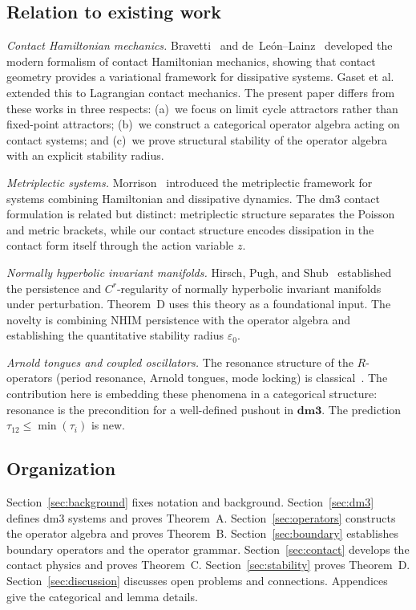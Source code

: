 \documentclass[12pt, oneside]{book}
\theoremstyle{plain}
\theoremstyle{definition}
\theoremstyle{remark}
\newcommand{\dmcat}{\mathbf{dm3}}
\begin{document}
\subsection{Relation to existing work}\label{sec:related}

\emph{Contact Hamiltonian mechanics.}
Bravetti~\cite{Bravetti2017} and de~Le\'on--Lainz~\cite{deLeonLainz2019}
developed the modern formalism of contact Hamiltonian mechanics, showing
that contact geometry provides a variational framework for dissipative
systems. Gaset et al.~\cite{Gaset2020} extended this to Lagrangian
contact mechanics. The present paper differs from these works in three
respects: (a)~we focus on limit cycle attractors rather than fixed-point
attractors; (b)~we construct a categorical operator algebra acting on
contact systems; and (c)~we prove structural stability of the operator
algebra with an explicit stability radius.

\emph{Metriplectic systems.}
Morrison~\cite{Morrison1986} introduced the metriplectic framework for
systems combining Hamiltonian and dissipative dynamics. The dm3 contact
formulation is related but distinct: metriplectic structure separates the
Poisson and metric brackets, while our contact structure encodes dissipation
in the contact form itself through the action variable $z$.

\emph{Normally hyperbolic invariant manifolds.}
Hirsch, Pugh, and Shub~\cite{HPS} established the persistence and
$C^r$-regularity of normally hyperbolic invariant manifolds under
perturbation. Theorem~D uses this theory as a foundational input.
The novelty is combining NHIM persistence with the operator algebra
and establishing the quantitative stability radius $\varepsilon_0$.

\emph{Arnold tongues and coupled oscillators.}
The resonance structure of the $R$-operators (period resonance, Arnold
tongues, mode locking) is classical~\cite{Arnold,Pikovsky}. The contribution
here is embedding these phenomena in a categorical structure: resonance is
the precondition for a well-defined pushout in $\dmcat$. The prediction
$\tau_{12}\le\min(\tau_i)$ is new.

\subsection{Organization}

Section~\ref{sec:background} fixes notation and background.
Section~\ref{sec:dm3} defines dm3 systems and proves Theorem~A.
Section~\ref{sec:operators} constructs the operator algebra and proves
Theorem~B.
Section~\ref{sec:boundary} establishes boundary operators and the
operator grammar.
Section~\ref{sec:contact} develops the contact physics and proves
Theorem~C.
Section~\ref{sec:stability} proves Theorem~D.
Section~\ref{sec:discussion} discusses open problems and connections.
Appendices give the categorical and lemma details.
\end{document}
